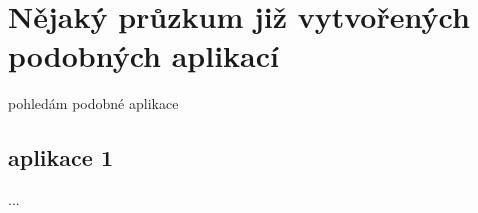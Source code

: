 \section{Nějaký průzkum již vytvořených podobných aplikací}
pohledám podobné aplikace

\subsection{aplikace 1}
...

